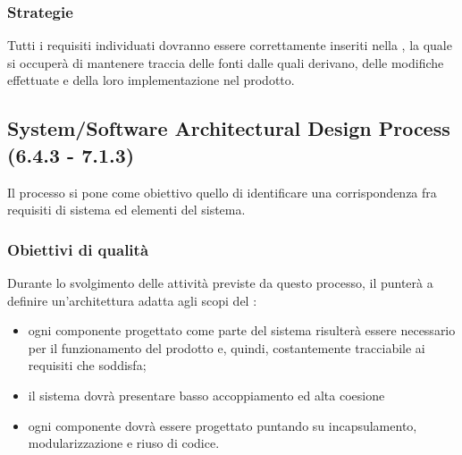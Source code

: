 \subsubsection{Strategie}
Tutti i requisiti individuati dovranno essere correttamente inseriti nella  \pragmadb, la quale si occuperà di mantenere traccia delle fonti dalle quali derivano, delle modifiche effettuate e della loro implementazione nel prodotto.
\subsection{System/Software Architectural Design Process (6.4.3 - 7.1.3)}
\label{sySoArchiDesign}
Il processo si pone come obiettivo quello di identificare una corrispondenza fra requisiti di sistema ed elementi del sistema.
\subsubsection{Obiettivi di qualità}
Durante lo svolgimento delle attività previste da questo processo, il  punterà a definire un'architettura adatta agli scopi del :
\begin{itemize}
\item ogni componente progettato come parte del sistema risulterà essere necessario per il funzionamento del prodotto e, quindi, costantemente tracciabile ai requisiti che soddisfa;
\item il sistema dovrà presentare basso accoppiamento ed alta coesione
\item ogni componente dovrà essere progettato puntando su incapsulamento, modularizzazione e riuso di codice.
\end{itemize}
